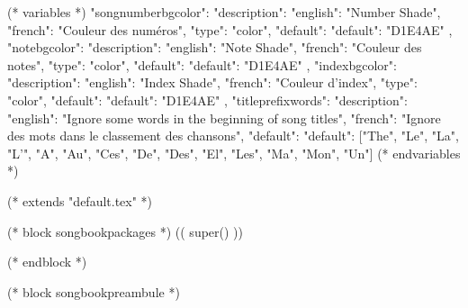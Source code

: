 

(* variables *)
{
"songnumberbgcolor": {"description": {"english": "Number Shade", "french": "Couleur des numéros"},
                     "type": "color",
                     "default": {"default": "D1E4AE"}
                  },
"notebgcolor": {"description": {"english": "Note Shade", "french": "Couleur des notes"},
               "type": "color",
               "default": {"default": "D1E4AE"}
            },
"indexbgcolor": {"description": {"english": "Index Shade", "french": "Couleur d'index"},
               "type": "color",
               "default": {"default": "D1E4AE"}
            },
"titleprefixwords": {"description": {"english": "Ignore some words in the beginning of song titles",
                                     "french": "Ignore des mots dans le classement des chansons"},
                     "default": {"default": ["The", "Le", "La", "L'", "A", "Au", "Ces", "De",
                     						 "Des", "El", "Les", "Ma", "Mon", "Un"]}
                     }
}
(* endvariables *)

(* extends "default.tex" *)

(* block songbookpackages *)
   (( super() ))

\usepackage[((booktype)),
            (* for option in bookoptions *)((option)),
            (* endfor *)
            (* for instrument in instruments *)((instrument)),
            (* endfor *)]{crepbook}
  \usepackage{chords}
(* endblock *)

(* block songbookpreambule *)
   \usepackage[
     a4paper %
     ,includeheadfoot %
     ,hmarginratio=1:1 %
     ,outer=1.8cm %
     ,vmarginratio=1:1 %
     ,bmargin=1.3cm %
     ]{geometry}

